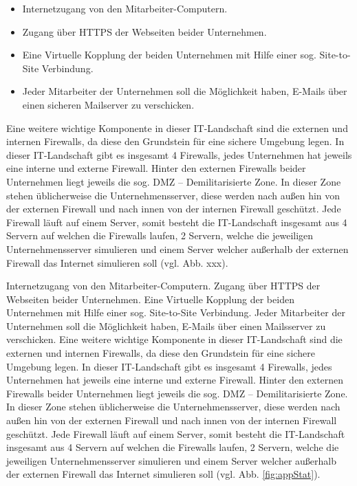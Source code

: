 \documentclass[
a4paper,     %
 headsepline, %
footsepline, %
titlepage,   %
 halfparskip,     %
 fleqn,       %
12pt         %
]{scrartcl}  %
\begin{document}
\begin{itemize}
\item Internetzugang von den Mitarbeiter-Computern.
\item Zugang über HTTPS der Webseiten beider Unternehmen.
\item Eine Virtuelle Kopplung der beiden Unternehmen mit Hilfe einer sog. Site-to-Site Verbindung.
\item Jeder Mitarbeiter der Unternehmen soll die Möglichkeit haben, E-Mails über einen sicheren  Mailserver zu verschicken.  
\end{itemize}
Eine weitere wichtige Komponente in dieser IT-Landschaft sind die externen und internen Firewalls, da diese den Grundstein für eine sichere Umgebung legen. In dieser IT-Landschaft gibt es insgesamt 4 Firewalls, jedes Unternehmen hat jeweils eine interne und externe Firewall. Hinter den externen Firewalls beider Unternehmen liegt jeweils die sog. DMZ – Demilitarisierte Zone. In dieser Zone stehen üblicherweise die Unternehmensserver, diese werden nach außen hin von der externen Firewall und nach innen von der internen Firewall geschützt. Jede Firewall läuft auf einem Server, somit besteht die IT-Landschaft insgesamt aus 4 Servern auf welchen die Firewalls laufen, 2 Servern, welche die jeweiligen Unternehmensserver simulieren und einem Server welcher außerhalb der externen Firewall das Internet simulieren soll (vgl. Abb. xxx).

Internetzugang von den Mitarbeiter-Computern.
Zugang über HTTPS der Webseiten beider Unternehmen.
Eine Virtuelle Kopplung der beiden Unternehmen mit Hilfe einer sog. Site-to-Site Verbindung.
Jeder Mitarbeiter der Unternehmen soll die Möglichkeit haben, E-Mails über einen Mailsserver zu verschicken.  
Eine weitere wichtige Komponente in dieser IT-Landschaft sind die externen und internen Firewalls, da diese den Grundstein für eine sichere Umgebung legen. In dieser IT-Landschaft gibt es insgesamt 4 Firewalls, jedes Unternehmen hat jeweils eine interne und externe Firewall. Hinter den externen Firewalls beider Unternehmen liegt jeweils die sog. DMZ – Demilitarisierte Zone. In dieser Zone stehen üblicherweise die Unternehmensserver, diese werden nach außen hin von der externen Firewall und nach innen von der internen Firewall geschützt. Jede Firewall läuft auf einem Server, somit besteht die IT-Landschaft insgesamt aus 4 Servern auf welchen die Firewalls laufen, 2 Servern, welche die jeweiligen Unternehmensserver simulieren und einem Server welcher außerhalb der externen Firewall das Internet simulieren soll (vgl. Abb. \ref{fig:appStat}).
\end{document}
